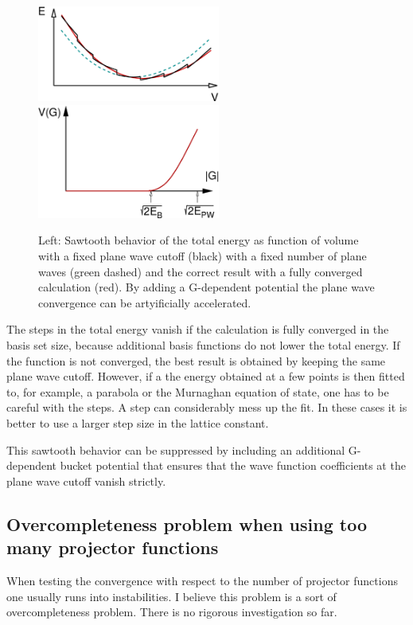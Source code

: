 \documentclass[final,12pt]{article}
\begin{document}
{{{{{{\begin{figure}[h!]
\includegraphics[width=6cm]{Figs/Sawtooth/sawtooth.eps}
\includegraphics[width=6cm]{Figs/Gbucket/gbucket.eps}
\label{fig:sawtooth}
\caption{Left: Sawtooth behavior of the total energy as function of
volume with a fixed plane wave cutoff (black) with a fixed number of
plane waves (green dashed) and the correct result with a fully
converged calculation (red). By adding a G-dependent potential the
plane wave convergence can be artyificially accelerated.}
\end{figure}

The steps in the total energy vanish if the calculation is fully converged in
the basis set size, because additional basis functions do not lower the total
energy. If the function is not converged, the best result is obtained by
keeping the same plane wave cutoff. However, if a the energy obtained at a few
points is then fitted to, for example, a parabola or the Murnaghan equation of
state\cite{murnaghan44_pnas30_244}, one has to be careful with the steps. A
step can considerably mess up the fit. In these cases it is better to use a
larger step size in the lattice constant.

This sawtooth behavior can be suppressed by including an additional
G-dependent bucket potential that ensures that the wave function
coefficients at the plane wave cutoff vanish strictly.

\subsection{Overcompleteness problem when using too many projector functions}
When testing the convergence with respect to the number of projector
functions one usually runs into instabilities. I believe this problem
is a sort of overcompleteness problem. There is no rigorous
investigation so far.

}}}}}}
\end{document}
